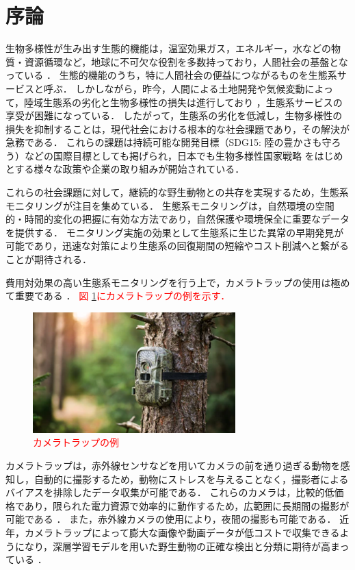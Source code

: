 \documentclass[a4paper,11pt,nomag]{jsreport}
\begin{document}
\chapter*{序論}

生物多様性が生み出す生態的機能は，温室効果ガス，エネルギー，水などの物質・資源循環など，地球に不可欠な役割を多数持っており，人間社会の基盤となっている \cite{millennium-ecosystem2005,cardinale2011}．
生態的機能のうち，特に人間社会の便益につながるものを生態系サービスと呼ぶ．
しかしながら，昨今，人間による土地開発や気候変動によって，陸域生態系の劣化と生物多様性の損失は進行しており \cite{newbold2015,isbell2017}，生態系サービスの享受が困難になっている．
したがって，生態系の劣化を低減し，生物多様性の損失を抑制することは，現代社会における根本的な社会課題であり，その解決が急務である．
これらの課題は持続可能な開発目標（SDG15: 陸の豊かさも守ろう）などの国際目標としても掲げられ，日本でも生物多様性国家戦略 \cite{biodiversity2023}をはじめとする様々な政策や企業の取り組みが開始されている．

これらの社会課題に対して，継続的な野生動物との共存を実現するため，生態系モニタリングが注目を集めている．
生態系モニタリングは，自然環境の空間的・時間的変化の把握に有効な方法であり，自然保護や環境保全に重要なデータを提供する．
モニタリング実施の効果として生態系に生じた異常の早期発見が可能であり，迅速な対策により生態系の回復期間の短縮やコスト削減へと繋がることが期待される．

費用対効果の高い生態系モニタリングを行う上で，カメラトラップの使用は極めて重要である \cite{jia2022}．
\textcolor{red}{図 \ref{fig:cameratrap}にカメラトラップの例を示す．}

\begin{figure}[tbp]
  \centering
  \includegraphics[width=0.5\linewidth, keepaspectratio]{image/cameratrap.png}
  \caption{\textcolor{red}{カメラトラップの例}}
  \label{fig:cameratrap}
\end{figure}

カメラトラップは，赤外線センサなどを用いてカメラの前を通り過ぎる動物を感知し，自動的に撮影するため，動物にストレスを与えることなく，撮影者によるバイアスを排除したデータ収集が可能である\cite{newey2015,zhu2017}．
これらのカメラは，比較的低価格であり，限られた電力資源で効率的に動作するため，広範囲に長期間の撮影が可能である \cite{schneider2018, carl2020}．
また，赤外線カメラの使用により，夜間の撮影も可能である．
近年，カメラトラップによって膨大な画像や動画データが低コストで収集できるようになり，深層学習モデルを用いた野生動物の正確な検出と分類に期待が高まっている \cite{tan2022}．
\end{document}
